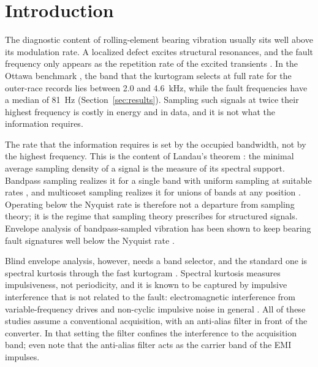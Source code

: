 \section{Introduction}
\label{sec:intro}

The diagnostic content of rolling-element bearing vibration usually sits well above its modulation
rate. A localized defect excites structural resonances, and the fault frequency only appears as the
repetition rate of the excited transients \citep{randall2011bearing}. In the Ottawa benchmark
\citep{huang2018ottawa}, the band that the kurtogram selects at full rate for the outer-race
records lies between 2.0 and 4.6~kHz, while the fault frequencies have a median of 81~Hz
(Section~\ref{sec:results}). Sampling such signals at twice their highest frequency is costly in
energy and in data, and it is not what the information requires.

The rate that the information requires is set by the occupied bandwidth, not by the highest
frequency. This is the content of Landau's theorem \citep{landau1967}: the minimal average
sampling density of a signal is the measure of its spectral support. Bandpass sampling realizes
it for a single band with uniform sampling at suitable rates \citep{vaughan1991}, and multicoset
sampling realizes it for unions of bands at any position
\citep{venkataramani2001optimal,mishali2009xampling}. Operating below the Nyquist rate is therefore
not a departure from sampling theory; it is the regime that sampling theory prescribes for
structured signals. Envelope analysis of bandpass-sampled vibration has been shown to keep bearing
fault signatures well below the Nyquist rate \citep{lu2018undersampled}.

Blind envelope analysis, however, needs a band selector, and the standard one is spectral kurtosis
through the fast kurtogram \citep{antoni2007kurtogram}. Spectral kurtosis measures impulsiveness,
not periodicity, and it is known to be captured by impulsive interference that is not related to
the fault: electromagnetic interference from variable-frequency drives \citep{smith2016emi,
vaerenberg2025cyclicemi} and non-cyclic impulsive noise in general
\citep{hebdasobkowicz2020nongaussian,hebdasobkowicz2025robustcorr}. All of these studies assume a
conventional acquisition, with an anti-alias filter in front of the converter. In that setting the
filter confines the interference to the acquisition band; \citet{vaerenberg2025cyclicemi} even
note that the anti-alias filter acts as the carrier band of the EMI impulses.

